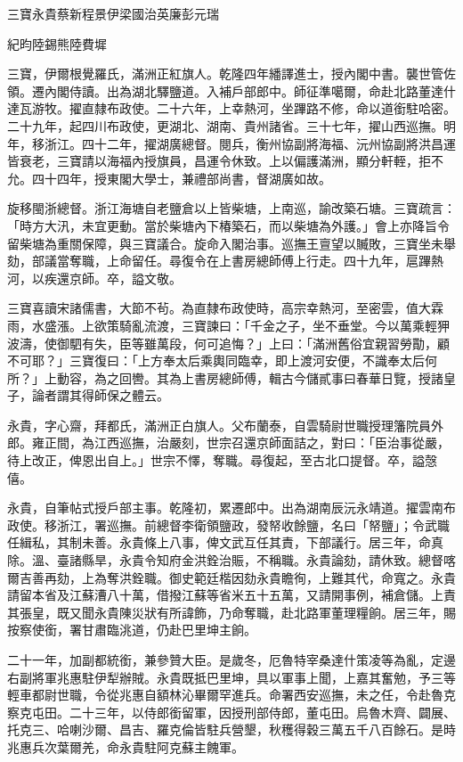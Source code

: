 
\begin{pinyinscope}
三寶永貴蔡新程景伊梁國治英廉彭元瑞

紀昀陸錫熊陸費墀

三寶，伊爾根覺羅氏，滿洲正紅旗人。乾隆四年繙譯進士，授內閣中書。襲世管佐領。遷內閣侍讀。出為湖北驛鹽道。入補戶部郎中。師征準噶爾，命赴北路董達什達瓦游牧。擢直隸布政使。二十六年，上幸熱河，坐蹕路不修，命以道銜駐哈密。二十九年，起四川布政使，更湖北、湖南、貴州諸省。三十七年，擢山西巡撫。明年，移浙江。四十二年，擢湖廣總督。閱兵，衡州協副將海福、沅州協副將洪昌運皆衰老，三寶請以海福內授旗員，昌運令休致。上以偏護滿洲，顯分軒輊，拒不允。四十四年，授東閣大學士，兼禮部尚書，督湖廣如故。

旋移閩浙總督。浙江海塘自老鹽倉以上皆柴塘，上南巡，諭改築石塘。三寶疏言：「時方大汛，未宜更動。當於柴塘內下椿築石，而以柴塘為外護。」會上亦降旨令留柴塘為重關保障，與三寶議合。旋命入閣治事。巡撫王亶望以贓敗，三寶坐未舉劾，部議當奪職，上命留任。尋復令在上書房總師傅上行走。四十九年，扈蹕熱河，以疾還京師。卒，謚文敬。

三寶喜讀宋諸儒書，大節不茍。為直隸布政使時，高宗幸熱河，至密雲，值大霖雨，水盛漲。上欲策騎亂流渡，三寶諫曰：「千金之子，坐不垂堂。今以萬乘輕狎波濤，使御駟有失，臣等雖萬段，何可追悔？」上曰：「滿洲舊俗宜親習勞勩，顧不可耶？」三寶復曰：「上方奉太后乘輿同臨幸，即上渡河安便，不識奉太后何所？」上動容，為之回轡。其為上書房總師傅，輯古今儲貳事曰春華日覽，授諸皇子，論者謂其得師保之體云。

永貴，字心齋，拜都氏，滿洲正白旗人。父布蘭泰，自雲騎尉世職授理籓院員外郎。雍正間，為江西巡撫，治嚴刻，世宗召還京師面詰之，對曰：「臣治事從嚴，待上改正，俾恩出自上。」世宗不懌，奪職。尋復起，至古北口提督。卒，謚愨僖。

永貴，自筆帖式授戶部主事。乾隆初，累遷郎中。出為湖南辰沅永靖道。擢雲南布政使。移浙江，署巡撫。前總督李衛領鹽政，發帑收餘鹽，名曰「帑鹽」；令武職任緝私，其制未善。永貴條上八事，俾文武互任其責，下部議行。居三年，命真除。溫、臺諸縣旱，永貴令知府金洪銓治賑，不稱職。永貴論劾，請休致。總督喀爾吉善再劾，上為奪洪銓職。御史範廷楷因劾永貴瞻徇，上難其代，命寬之。永貴請留本省及江蘇漕八十萬，借撥江蘇等省米五十五萬，又請開事例，補倉儲。上責其張皇，既又聞永貴陳災狀有所諱飾，乃命奪職，赴北路軍董理糧餉。居三年，賜按察使銜，署甘肅臨洮道，仍赴巴里坤主餉。

二十一年，加副都統銜，兼參贊大臣。是歲冬，厄魯特宰桑達什策凌等為亂，定邊右副將軍兆惠駐伊犁辦賊。永貴既抵巴里坤，具以軍事上聞，上嘉其奮勉，予三等輕車都尉世職，令從兆惠自額林沁畢爾罕進兵。命署西安巡撫，未之任，令赴魯克察克屯田。二十三年，以侍郎銜留軍，因授刑部侍郎，董屯田。烏魯木齊、闢展、托克三、哈喇沙爾、昌吉、羅克倫皆駐兵營墾，秋穫得穀三萬五千八百餘石。是時兆惠兵次葉爾羌，命永貴駐阿克蘇主餽軍。


\end{pinyinscope}
